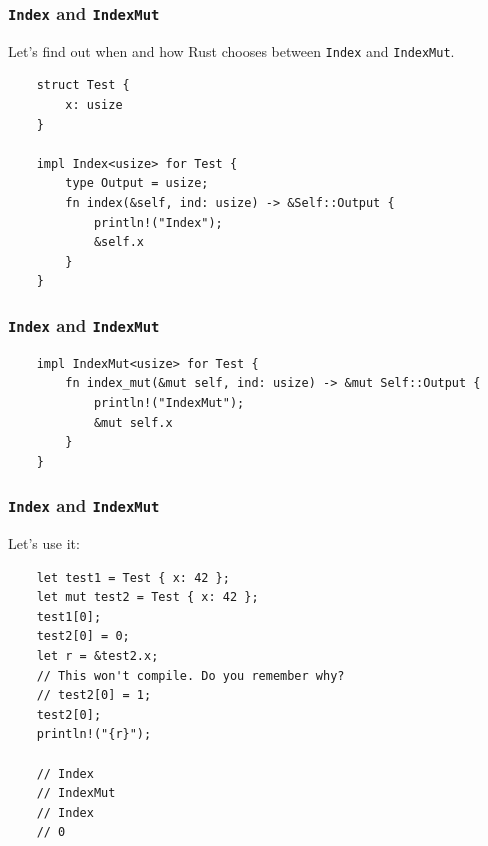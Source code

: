 \documentclass[aspectratio=1610,t]{beamer}
\begin{document}

\begin{frame}[fragile]
\frametitle{\texttt{Index} and \texttt{IndexMut}}
Let's find out when and how Rust chooses between \texttt{Index} and \texttt{IndexMut}.

\begin{verbatim}
    struct Test {
        x: usize
    }

    impl Index<usize> for Test {
        type Output = usize;
        fn index(&self, ind: usize) -> &Self::Output {
            println!("Index");
            &self.x
        }
    }
\end{verbatim}
\end{frame}


\begin{frame}[fragile]
\frametitle{\texttt{Index} and \texttt{IndexMut}}
\begin{verbatim}
    impl IndexMut<usize> for Test {
        fn index_mut(&mut self, ind: usize) -> &mut Self::Output {
            println!("IndexMut");
            &mut self.x
        }
    }
\end{verbatim}
\end{frame}


\begin{frame}[fragile]
\frametitle{\texttt{Index} and \texttt{IndexMut}}
Let's use it:

\begin{verbatim}
    let test1 = Test { x: 42 };
    let mut test2 = Test { x: 42 };
    test1[0];
    test2[0] = 0;
    let r = &test2.x;
    // This won't compile. Do you remember why?
    // test2[0] = 1;
    test2[0];
    println!("{r}");

    // Index
    // IndexMut
    // Index
    // 0
\end{verbatim}
\end{frame}

\end{document}
